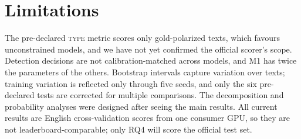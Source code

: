 \documentclass[11pt]{article}
\newcommand{\TYPE}{\textsc{type}}
\begin{document}
\section*{Limitations}
The pre-declared \TYPE{} metric scores only gold-polarized texts, which
favours unconstrained models, and we have not yet confirmed the official
scorer's scope. Detection decisions are not calibration-matched across
models, and M1 has twice the parameters of the others. Bootstrap intervals
capture variation over texts; training variation is reflected only through
five seeds, and only the six pre-declared tests are corrected for multiple
comparisons. The decomposition and probability analyses were designed after
seeing the main results. All current results are English cross-validation
scores from one consumer GPU, so they are not leaderboard-comparable; only
RQ4 will score the official test set.


\end{document}
